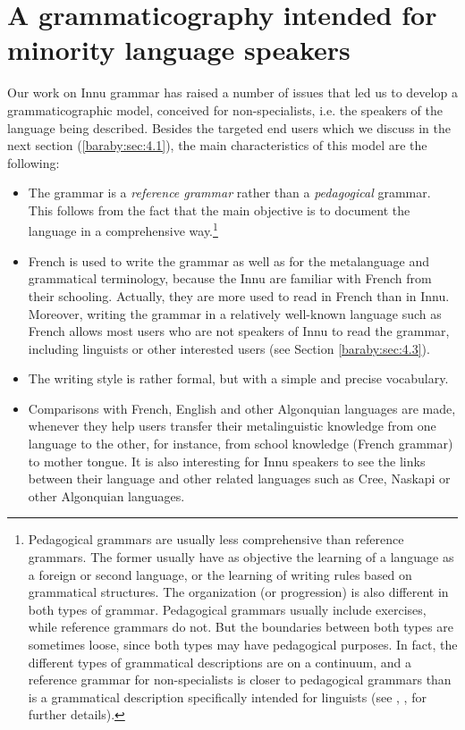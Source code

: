 \section[Grammaticography for minority language speakers]{A grammaticography intended for minority language speakers}
Our work on Innu grammar has raised a number of issues that led us to develop a grammaticographic model, conceived for non-specialists, i.e. the speakers of the language being described. Besides the targeted end users which we discuss in the next section (\ref{baraby:sec:4.1}), the main characteristics of this model are the following:
\begin{itemize}
\item The grammar is a \textit{reference grammar} rather than a \textit{pedagogical} grammar. This follows from the fact that the main objective is to document the language in a comprehensive way.\footnote{Pedagogical
 grammars are usually less comprehensive than reference grammars. The former usually have as objective the learning of a language as a foreign or second language, or the learning of writing rules based on grammatical structures. The organization (or progression) is also different in both types of grammar. Pedagogical grammars usually include exercises, while reference grammars do not. But the boundaries between both types are sometimes loose, since both types may have pedagogical purposes. In fact, the different types of grammatical descriptions are on a continuum, and a reference grammar for non-specialists is closer to pedagogical grammars than is a grammatical description specifically intended for linguists (see \citet[46-56]{GermainEtAl1995}, \citet[1-2]{Dirven1990}, \citet[210-236]{Baraby2011a} for further details).}
\item French is used to write the grammar as well as for the metalanguage and grammatical terminology, because the Innu are familiar with French from their schooling. Actually, they are more used to read in French than in Innu. Moreover, writing the grammar in a relatively well-known language such as French allows most users who are not speakers of Innu to read the grammar, including linguists or other interested users (see Section \ref{baraby:sec:4.3}). 
\item The writing style is rather formal, but with a simple and precise vocabulary.
\item Comparisons with French, English and other Algonquian languages are made, whenever they help users transfer their metalinguistic knowledge from one language to the other, for instance, from school knowledge (French grammar) to mother tongue. It is also interesting for Innu speakers to see the links between their language and other related languages such as Cree, Naskapi or other Algonquian languages.

\end{itemize}
